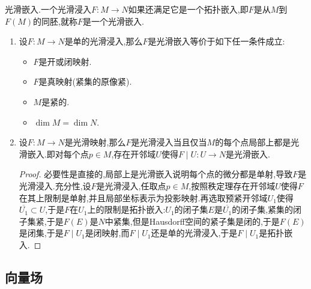 光滑嵌入.一个光滑浸入$F:M\to N$如果还满足它是一个拓扑嵌入,即$F$是从$M$到$F(M)$的同胚,就称$F$是一个光滑嵌入.
\begin{enumerate}
	\item 设$F:M\to N$是单的光滑浸入,那么$F$是光滑嵌入等价于如下任一条件成立:
	\begin{itemize}
		\item $F$是开或闭映射.
		\item $F$是真映射(紧集的原像紧).
		\item $M$是紧的.
		\item $\dim M=\dim N$.
	\end{itemize}
    \item 设$F:M\to N$是光滑映射,那么$F$是光滑浸入当且仅当$M$的每个点局部上都是光滑嵌入.即对每个点$p\in M$,存在开邻域$U$使得$F\mid U:U\to N$是光滑嵌入.
    \begin{proof}
    	
    	必要性是直接的,局部上是光滑嵌入说明每个点的微分都是单射,导致$F$是光滑浸入.充分性,设$F$是光滑浸入,任取点$p\in M$,按照秩定理存在开邻域$U$使得$F$在其上限制是单射,并且局部坐标表示为投影映射.再选取预紧开邻域$U_1$使得$\overline{U_1}\subset U$,于是$F$在$U_1$上的限制是拓扑嵌入:$U_1$的闭子集$E$是$\overline{U_1}$的闭子集,紧集的闭子集紧,于是$F(E)$是$N$中紧集,但是Hausdorff空间的紧子集是闭的,于是$F(E)$是闭集,于是$F\mid U_1$是闭映射,而$F\mid U_1$还是单的光滑浸入,于是$F\mid U_1$是拓扑嵌入.
    \end{proof}
\end{enumerate}

\subsection{向量场}


